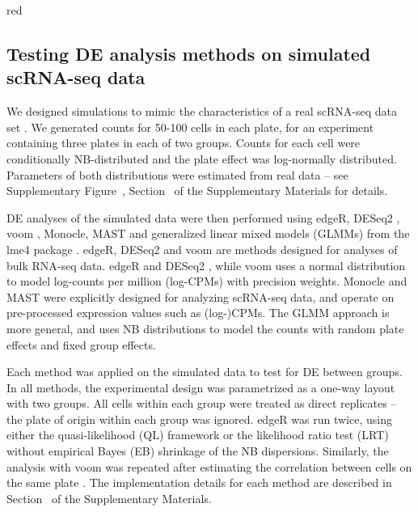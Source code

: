 \documentclass[oupdraft]{bio}
\begin{document}
\begin{color}{red}
\subsection{Testing DE analysis methods on simulated scRNA-seq data}
We designed simulations to mimic the characteristics of a real scRNA-seq data set \citep{kolod2015single}.
We generated counts for 50-100 cells in each plate, for an experiment containing three plates in each of two groups.
Counts for each cell were conditionally NB-distributed and the plate effect was log-normally distributed.
Parameters of both distributions were estimated from real data -- see Supplementary Figure~\suppparamsim{}, Section~\suppsimulation{} of the Supplementary Materials for details.

DE analyses of the simulated data were then performed using edgeR, DESeq2 \citep{love2014moderated}, voom \citep{law2014voom}, Monocle, MAST \citep{finak2015mast} and generalized linear mixed models (GLMMs) from the lme4 package \citep{bates2015fitting}.
edgeR, DESeq2 and voom are methods designed for analyses of bulk RNA-seq data.
edgeR and DESeq2 , while voom uses a normal distribution to model log-counts per million (log-CPMs) with precision weights.
Monocle and MAST were explicitly designed for analyzing scRNA-seq data, and operate on pre-processed expression values such as (log-)CPMs.
The GLMM approach is more general, and uses NB distributions to model the counts with random plate effects and fixed group effects.
\end{color}

Each method was applied on the simulated data to test for DE between groups. 
In all methods, the experimental design was parametrized as a one-way layout with two groups.
All cells within each group were treated as direct replicates -- the plate of origin within each group was ignored.
edgeR was run twice, using either the quasi-likelihood (QL) framework \citep{lund2012detecting} 
    or the likelihood ratio test (LRT) \citep{mccarthy2012differential} without empirical Bayes (EB) shrinkage of the NB dispersions.
Similarly, the analysis with voom was repeated after estimating the correlation between cells on the same plate \citep{smyth2005use}.
The implementation details for each method are described in Section~\suppimplementation{} of the Supplementary Materials.
\end{document}
